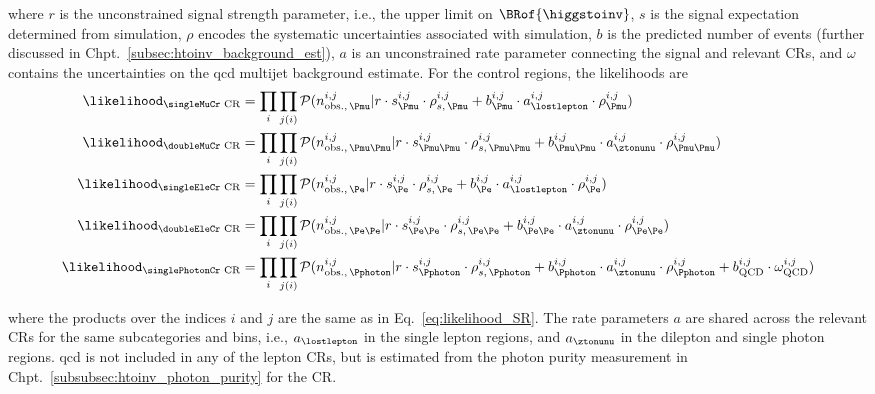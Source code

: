 where $r$ is the unconstrained signal strength parameter, i.e., the upper limit on $\BRof{\higgstoinv}$, $s$ is the signal expectation determined from simulation, $\rho$ encodes the systematic uncertainties associated with simulation, $b$ is the predicted number of events (further discussed in Chpt.~\ref{subsec:htoinv_background_est}), $a$ is an unconstrained rate parameter connecting the signal and relevant \glspl{CR}, and $\omega$ contains the uncertainties on the \acrshort{qcd} multijet background estimate. For the control regions, the likelihoods are
\begin{equation}
    \begin{aligned}
\likelihood_{\text{\singleMuCr CR}} &= \prod_{i} \prod_{j(i)} \mathcal{P}( n_{\mathrm{obs.}, \, \Pmu }^{i, j} | r \cdot s^{i, j}_{\Pmu} \cdot \rho_{s,\, \Pmu}^{i, j} + b_{\Pmu}^{i, j} \cdot a_{\lostlepton}^{i, j} \cdot \rho_{\Pmu}^{i, j} )\\
\likelihood_{\text{\doubleMuCr CR}} &= \prod_{i} \prod_{j(i)} \mathcal{P}( n_{\mathrm{obs.}, \, \Pmu\Pmu }^{i, j} | r \cdot s^{i, j}_{\Pmu\Pmu} \cdot \rho_{s,\, \Pmu\Pmu}^{i, j} + b_{\Pmu\Pmu}^{i, j} \cdot a_{\ztonunu}^{i, j} \cdot \rho_{\Pmu\Pmu}^{i, j} )\\
\likelihood_{\text{\singleEleCr CR}} &= \prod_{i} \prod_{j(i)} \mathcal{P}( n_{\mathrm{obs.}, \, \Pe }^{i, j} | r \cdot s^{i, j}_{\Pe} \cdot \rho_{s,\, \Pe}^{i, j} + b_{\Pe}^{i, j} \cdot a_{\lostlepton}^{i, j} \cdot \rho_{\Pe}^{i, j} )\\
\likelihood_{\text{\doubleEleCr CR}} &= \prod_{i} \prod_{j(i)} \mathcal{P}( n_{\mathrm{obs.}, \, \Pe\Pe }^{i, j} | r \cdot s^{i, j}_{\Pe\Pe} \cdot \rho_{s,\, \Pe\Pe}^{i, j} + b_{\Pe\Pe}^{i, j} \cdot a_{\ztonunu}^{i, j} \cdot \rho_{\Pe\Pe}^{i, j} )\\
\likelihood_{\text{\singlePhotonCr CR}} &= \prod_{i} \prod_{j(i)} \mathcal{P}( n_{\mathrm{obs.}, \, \Pphoton }^{i, j} | r \cdot s^{i, j}_{\Pphoton} \cdot \rho_{s,\, \Pphoton}^{i, j} + b_{\Pphoton}^{i, j} \cdot a_{\ztonunu}^{i, j} \cdot \rho_{\Pphoton}^{i, j} + b_{\mathrm{QCD}}^{i, j} \cdot \omega_{\mathrm{QCD}}^{i, j} )
    \end{aligned}
    \label{eq:likelihood_CRs}
\end{equation}

where the products over the indices $i$ and $j$ are the same as in Eq.~\ref{eq:likelihood_SR}. The rate parameters $a$ are shared across the relevant \glspl{CR} for the same subcategories and \ptmiss bins, i.e., $a_{\lostlepton}$ in the single lepton regions, and $a_{\ztonunu}$ in the dilepton and single photon regions. \acrshort{qcd} is not included in any of the lepton \glspl{CR}, but is estimated from the photon purity measurement in Chpt.~\ref{subsubsec:htoinv_photon_purity} for the \singlePhotonCr \gls{CR}.

